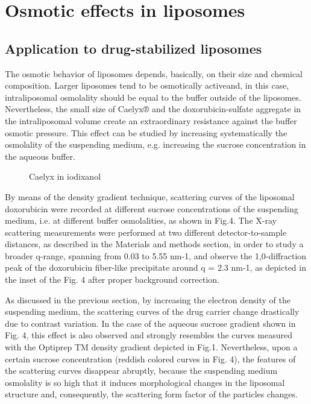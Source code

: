 \section{Osmotic effects in liposomes}
\subsection{Application to drug-stabilized liposomes}
The osmotic behavior of liposomes depends, basically, on their size and chemical composition. Larger liposomes tend to be osmotically activeand, in this case, intraliposomal osmolality should be equal to the buffer outside of the liposomes. Nevertheless, the small size of Caelyx® and the doxorubicin-sulfate aggregate in the intraliposomal volume create an extraordinary resistance against the buffer osmotic pressure. This effect can be studied by increasing systematically the osmolality of the suspending medium, e.g. increasing the sucrose concentration in the aqueous buffer.

\begin{figure}
	\centering
		\caption{Caelyx in iodixanol}
\end{figure}

By means of the density gradient technique, scattering curves of the liposomal doxorubicin were recorded at different sucrose concentrations of the suspending medium, i.e. at different buffer osmolalities, as shown in Fig.4. The X-ray scattering measurements were performed at two different detector-to-sample distances, as described in the Materials and methods section, in order to study a broader q-range, spanning from 0.03 to 5.55 nm-1, and observe the 1,0-diffraction peak of the doxorubicin fiber-like precipitate around q = 2.3 nm-1, as depicted in the inset of the Fig. 4 after proper background correction.

As discussed in the previous section, by increasing the electron density of the suspending medium, the scattering curves of the drug carrier change drastically due to contrast variation. In the case of the aqueous sucrose gradient shown in Fig. 4, this effect is also observed and strongly resembles the curves measured with the Optiprep TM density gradient depicted in Fig.1. Nevertheless, upon a certain sucrose concentration (reddish colored curves in Fig. 4), the features of the scattering curves disappear abruptly, because the suspending medium osmolality is so high that it induces morphological changes in the liposomal structure and, consequently, the scattering form factor of the particles changes.

